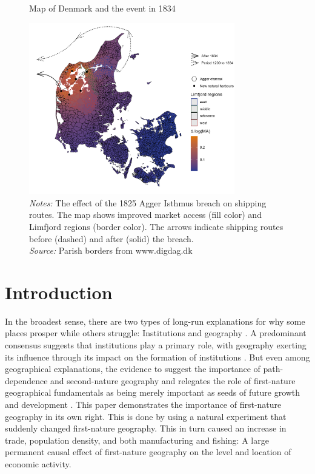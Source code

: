 \documentclass[11pt]{article}
\begin{document}
\begin{figure}[ht]
\centering
\caption{Map of Denmark and the event in 1834}
\includegraphics[width=0.8\textwidth]{Plots/Map.png}
\parbox{0.9\textwidth}{
\caption*{\footnotesize \textit{Notes:} The effect of the 1825 Agger Isthmus breach on shipping routes. The map shows improved market access (fill color) and Limfjord regions (border color). The arrows indicate shipping routes before (dashed) and after (solid) the breach. \\ \textit{Source:} Parish borders from www.digdag.dk}
}
\label{fig:main_map}
\end{figure}

\section{Introduction}
In the broadest sense, there are two types of long-run explanations for why some places prosper while others struggle: Institutions \citep{rodrik2004institutions} and geography \citep{Henderson2018satelite}. A predominant consensus suggests that institutions play a primary role, with geography exerting its influence through its impact on the formation of institutions \citep{Acemoglu2001, rodrik2004institutions, Easterly2003, Ketterer2018}. But even among geographical explanations, the evidence to suggest the importance of path-dependence and second-nature geography \citep{Krugman1991, Bleakley2012, Ager2020a} and relegates the role of first-nature geographical fundamentals as being merely important as seeds of future growth and development \citep{Davis2002, Bosker2017, Allen2023}. This paper demonstrates the importance of first-nature geography in its own right. This is done by using a natural experiment that suddenly changed first-nature geography. This in turn caused an increase in trade, population density, and both manufacturing and fishing: A large permanent causal effect of first-nature geography on the level and location of economic activity.  
\end{document}
